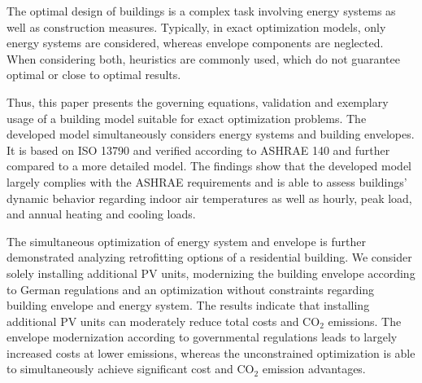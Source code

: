 The optimal design of buildings is a complex task involving energy systems as well as construction measures.
Typically, in exact optimization models, only energy systems are considered, whereas envelope components are neglected.
When considering both, heuristics are commonly used, which do not guarantee optimal or close to optimal results.

Thus, this paper presents the governing equations, validation and exemplary usage of a building model suitable for exact optimization problems.
The developed model simultaneously considers energy systems and building envelopes.
It is based on ISO 13790 and verified according to ASHRAE 140 and further compared to a more detailed model.
The findings show that the developed model largely complies with the ASHRAE requirements and is able to assess buildings' dynamic behavior regarding indoor air temperatures as well as hourly, peak load, and annual heating and cooling loads.

The simultaneous optimization of energy system and envelope is further demonstrated analyzing retrofitting options of a residential building.
We consider solely installing additional PV units, modernizing the building envelope according to German regulations and an optimization without constraints regarding building envelope and energy system.
The results indicate that installing additional PV units can moderately reduce total costs and CO$_2$ emissions.
The envelope modernization according to governmental regulations leads to largely increased costs at lower emissions, whereas the unconstrained optimization is able to simultaneously achieve significant cost and CO$_2$ emission advantages.
